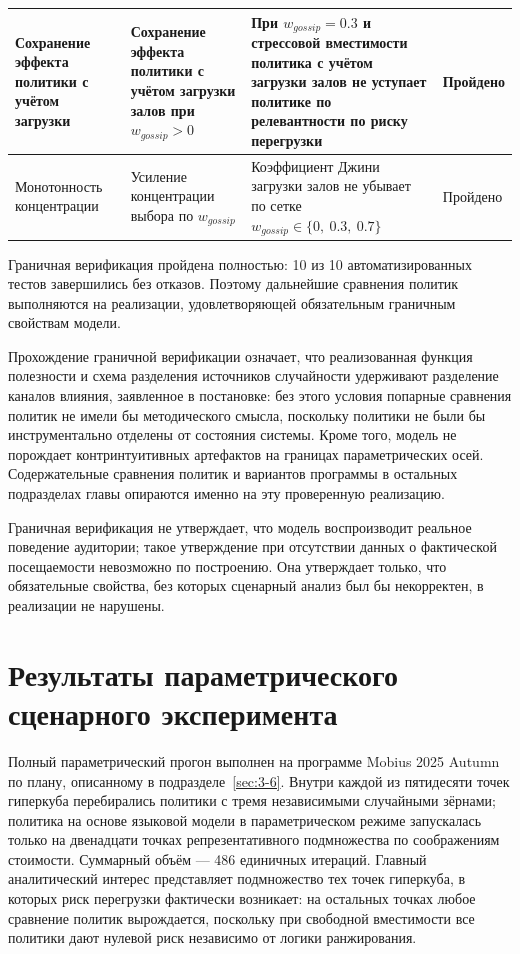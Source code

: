 \begin{small}
\begin{longtable}{|>{\raggedright\arraybackslash}p{2.7cm}|>{\raggedright\arraybackslash}p{3.7cm}|>{\raggedright\arraybackslash}p{5.7cm}|>{\centering\arraybackslash}p{2.0cm}|}
\hline
Сохранение эффекта политики с учётом загрузки & Сохранение эффекта политики с учётом загрузки залов при $w_{gossip} > 0$ & При $w_{gossip} = 0.3$ и стрессовой вместимости политика с учётом загрузки залов не уступает политике по релевантности по риску перегрузки & Пройдено \\
\hline
Монотонность концентрации & Усиление концентрации выбора по $w_{gossip}$ & Коэффициент Джини загрузки залов не убывает по сетке $w_{gossip} \in \{0,\ 0.3,\ 0.7\}$ & Пройдено \\
\end{longtable}
\end{small}

Граничная верификация пройдена полностью: 10 из 10 автоматизированных тестов завершились без отказов. Поэтому дальнейшие сравнения политик выполняются на реализации, удовлетворяющей обязательным граничным свойствам модели.

Прохождение граничной верификации означает, что реализованная функция полезности и схема разделения источников случайности удерживают разделение каналов влияния, заявленное в постановке: без этого условия попарные сравнения политик не имели бы методического смысла, поскольку политики не были бы инструментально отделены от состояния системы. Кроме того, модель не порождает контринтуитивных артефактов на границах параметрических осей. Содержательные сравнения политик и вариантов программы в остальных подразделах главы опираются именно на эту проверенную реализацию.

Граничная верификация не утверждает, что модель воспроизводит реальное поведение аудитории; такое утверждение при отсутствии данных о фактической посещаемости невозможно по построению. Она утверждает только, что обязательные свойства, без которых сценарный анализ был бы некорректен, в реализации не нарушены.


\section{Результаты параметрического сценарного эксперимента}
\label{sec:4-3}

Полный параметрический прогон выполнен на программе Mobius 2025 Autumn по плану, описанному в подразделе~\ref{sec:3-6}. Внутри каждой из пятидесяти точек гиперкуба перебирались политики с тремя независимыми случайными зёрнами; политика на основе языковой модели в параметрическом режиме запускалась только на двенадцати точках репрезентативного подмножества по соображениям стоимости. Суммарный объём --- 486 единичных итераций. Главный аналитический интерес представляет подмножество тех точек гиперкуба, в которых риск перегрузки фактически возникает: на остальных точках любое сравнение политик вырождается, поскольку при свободной вместимости все политики дают нулевой риск независимо от логики ранжирования.

